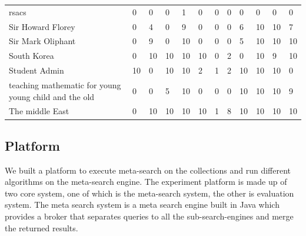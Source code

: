 \begin{table}
\begin{tabular*}{0.5\textwidth}{|p{5cm}|l|l|l|l|l|l|l|l|l|l|l|}
rsacs &0 &0 &0 &1 &0 &0 &0 &0 &0 &0 &0\\
\cline{1-12}
Sir Howard Florey &0 &4 &0 &9 &0 &0 &0 &6 &10 &10 &7\\
\cline{1-12}
Sir Mark Oliphant &0 &9 &0 &10 &0 &0 &0 &5 &10 &10 &10\\
\cline{1-12}
South Korea &0 &10 &10 &10 &10 &0 &2 &0 &10 &9 &10\\
\cline{1-12}
Student Admin &10 &0 &10 &10 &2 &1 &2 &10 &10 &10 &0\\
\cline{1-12}
teaching mathematic for young young child and the old &0 &0 &5 &10 &0 &0 &0 &10 &10 &10 &9\\
\cline{1-12}
The middle East &0 &10 &10 &10 &10 &1 &8 &10 &10 &10 &10\\
\cline{1-12}
\end{tabular*}
\end{table}
\subsection{Platform}
We built a platform to execute meta-search on the collections and run different algorithms on the meta-search engine. The experiment platform is made up of two core system, one of which is the meta-search system, the other is evaluation system. The meta search system is a meta search engine built in Java which provides a broker that separates queries to all the sub-search-engines and merge the returned results. 

